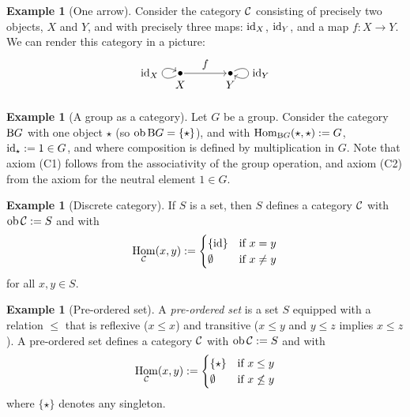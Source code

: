 \documentclass[11pt]{amsbook}
\DeclareMathOperator\Hom{Hom}
\DeclareMathOperator\ob{ob}
\def\id{{\rm id}}
\theoremstyle{plain}
\theoremstyle{definition}
\newtheorem{example}[theorem]{Example}
\begin{document}
\begin{example}[One arrow]\label{exa:one-arrow}
Consider the category ${\mathcal{C}}$ consisting of precisely two objects, $X$ and $Y$, and with precisely three maps: $\id_X$, $\id_Y$, and a map $f\colon X\to Y$. We can render this category in a picture:
\[
\begin{tikzpicture}
 \node (X) [label=below:{$X$}] at (-.8,0) {};
 \fill (X) circle[radius=2pt];
 \node (Y) [label=below:{$Y$}] at (.8,0) {};
 \fill (Y) circle[radius=2pt];
  \path (X) edge [loop left, out=-150,in=150,min distance=7mm, ->] node {$\id_X$} (X);
  \path (X) edge [->] node[above] {$f$} (Y);
  \path (Y) edge  [loop right, out=30,in=-30,min distance=7mm, ->] node {$\id_Y$} (Y);
\end{tikzpicture}
\]
\end{example}

\begin{example}[A group as a category] \label{exa:BG}
Let $G$ be a group. Consider the category ${\mathrm B} G$ with one object
$\star$ (so $\ob\rB G = \{ \star\}$), and with $\Hom_{\rB G}(\star,\star) := G$, $\id_\star := 1 \in G$, and where composition is defined by multiplication in $G$. Note that axiom (C1) follows from the associativity of the group operation, and axiom (C2) from the axiom for the neutral element $1\in G$.
\end{example}

\begin{example}[Discrete category]\label{exa:discrete-cat}
If $S$ is a set, then $S$ defines a category ${\mathcal{C}}$ with $\ob \cC := S$ and with
\[
	\Hom_\cC(x,y) := \begin{cases}  \{ \id \} & \text{if $x=y$} \\ \emptyset &\text{if $x\neq y$} \end{cases}
\]
for all $x,y\in S$.
\end{example}

\begin{example}[Pre-ordered set]\label{exa:pre-ordered}
A \emph{pre-ordered set} is a set $S$ equipped with a relation $\leq$ that is reflexive ($x\leq x$)  and transitive ($x\leq y$ and $y\leq z$ implies $x\leq z$). A pre-ordered set defines a category ${\mathcal{C}}$ with $\ob \cC := S$ and with
\[
	\Hom_\cC(x,y) := \begin{cases}  \{  \star \} & \text{if $x\leq y$} \\ \emptyset &\text{if $x\not\leq y$} \end{cases}
\]
where $\{\star\}$ denotes any singleton. 
\end{example}
\end{document}
